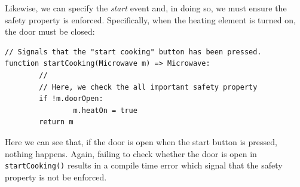 Likewise, we can specify the {\em start} event and, in doing so, we must ensure the safety property is enforced.  Specifically, when the heating element is turned on, the door must be closed:

\begin{lstlisting}
// Signals that the "start cooking" button has been pressed. 
function startCooking(Microwave m) => Microwave:
        //        
        // Here, we check the all important safety property
        if !m.doorOpen:
                m.heatOn = true
        return m
\end{lstlisting}

Here we can see that, if the door is open when the start button is pressed, nothing happens.  Again, failing to check whether the door is open in \lstinline{startCooking()} results in a compile time error which signal that the safety property is not be enforced.
